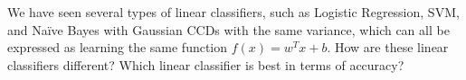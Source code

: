 We have seen several types of linear classifiers, such as Logistic Regression, SVM, and Naïve Bayes with Gaussian CCDs with the same variance, which can all be expressed as learning the same function \(f(x)=w^Tx+b\). How are these linear classifiers different? Which linear classifier is best in terms of accuracy?
